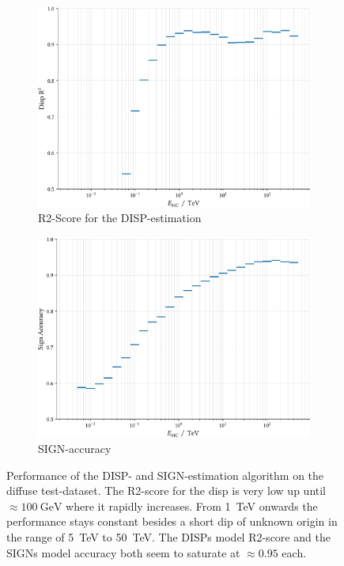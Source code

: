 \begin{figure}
    \begin{subfigure}{0.45\textwidth}
        \includegraphics[width=0.9\linewidth]{../analysis/plots/disp_test_r2_equal_sized.pdf} 
        \caption{R2-Score for the DISP-estimation}
    \end{subfigure}
    \begin{subfigure}{0.45\textwidth}
        \includegraphics[width=0.9\linewidth]{../analysis/plots/disp_test_acc_equal_sized.pdf}
        \caption{SIGN-accuracy}
    \end{subfigure}
    \caption{
    	Performance of the DISP- and SIGN-estimation algorithm on the diffuse test-dataset.
	The R2-score for the disp is very low up until $\approx \SI{100}{\giga\electronvolt}$
	where it rapidly increases. From \SI{1}{\tera\electronvolt} onwards 
	the performance stays constant besides a short dip of unknown origin 
	in the range of \SI{5}{\tera\electronvolt} to \SI{50}{\tera\electronvolt}.
	The DISPs model R2-score and the SIGNs model accuracy both seem to saturate
	at $\approx\num{0.95}$ each.}
    \label{fig:disp_test_perf}
\end{figure}


